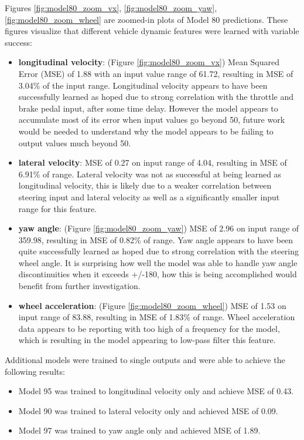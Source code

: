 \documentclass{article}
\begin{document}
 Figures \ref{fig:model80_zoom_vx}, \ref{fig:model80_zoom_yaw}, \ref{fig:model80_zoom_wheel} are zoomed-in plots of Model 80 predictions. These figures visualize that different vehicle dynamic features were learned with variable success: 
 \begin{itemize}
     \item \textbf{longitudinal velocity}: (Figure \ref{fig:model80_zoom_vx}) Mean Squared Error (MSE) of 1.88 with an input value range of 61.72, resulting in MSE of 3.04\% of the input range. Longitudinal velocity appears to have been successfully learned as hoped due to strong correlation with the throttle and brake pedal input, after some time delay. However the model appears to accumulate most of its error when input values go beyond 50, future work would be needed to understand why the model appears to be failing to output values much beyond 50.
     \item \textbf{lateral velocity}: MSE of 0.27 on input range of 4.04, resulting in MSE of 6.91\% of range. Lateral velocity was not as successful at being learned as longitudinal velocity, this is likely due to a weaker correlation between steering input and lateral velocity as well as a significantly smaller input range for this feature.
     \item \textbf{yaw angle}: (Figure \ref{fig:model80_zoom_yaw}) MSE of 2.96 on input range of 359.98, resulting in MSE of 0.82\% of range. Yaw angle appears to have been quite successfully learned as hoped due to strong correlation with the steering wheel angle. It is surprising how well the model was able to handle yaw angle discontinuities when it exceeds +/-180, how this is being accomplished would benefit from further investigation.
     \item \textbf{wheel acceleration}: (Figure \ref{fig:model80_zoom_wheel}) MSE of 1.53 on input range of 83.88, resulting in MSE of 1.83\% of range. Wheel acceleration data appears to be reporting with too high of a frequency for the model, which is resulting in the model appearing to low-pass filter this feature.
 \end{itemize}

Additional models were trained to single outputs and were able to achieve the following results:

\begin{itemize}
    \item Model 95 was trained to longitudinal velocity only and achieve MSE of 0.43.
    \item Model 90 was trained to lateral velocity only and achieved MSE of 0.09.
    \item Model 97 was trained to yaw angle only and achieved MSE of 1.89.
\end{itemize}
\end{document}
